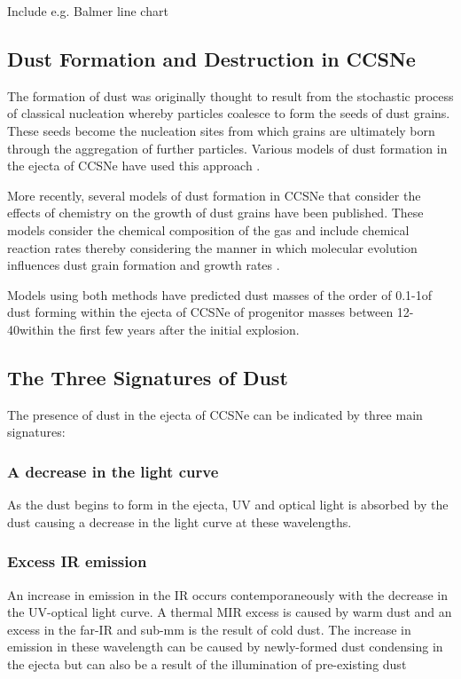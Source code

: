 Include e.g. Balmer line chart


\subsection{Dust Formation and Destruction in CCSNe}
\label{scn:dust_formation}
The formation of dust was originally thought to result from the stochastic process of classical nucleation whereby particles coalesce to form the seeds of dust grains.  These seeds become the nucleation sites from which grains are ultimately born through the aggregation of further particles.  Various models of dust formation in the ejecta of CCSNe have used this approach \citep{Kozasa1989, Todini2001,Nozawa2003, Schneider2004}.  

More recently, several models of dust formation in CCSNe that consider the effects of chemistry on the growth of dust grains have been published.   These models consider the chemical composition of the gas and include chemical reaction rates thereby considering the manner in which molecular evolution influences dust grain formation and growth rates \citep{Cherchneff2009, Cherchneff2010, Sarangi2013, Sarangi2015}.

Models using both methods have predicted dust masses of the order of 0.1-1\msun of dust forming within the ejecta of CCSNe of progenitor masses between 12-40\msun within the first few years after the initial explosion.


\subsection{The Three Signatures of Dust}
\label{three_sigs}


The presence of dust in the ejecta of CCSNe can be indicated by three main signatures: 

\subsubsection{A decrease in the light curve} 
As the dust begins to form in the ejecta, UV and optical light is absorbed by the dust causing a decrease in the light curve at these wavelengths.

\subsubsection{Excess IR emission}
An increase in emission in the IR occurs contemporaneously with the decrease in the UV-optical light curve.  A thermal MIR excess is caused by warm dust and an excess in the far-IR and sub-mm is the result of cold dust.  The increase in emission in these wavelength can be caused by newly-formed dust condensing in the ejecta but can also be a result of the illumination of pre-existing dust

